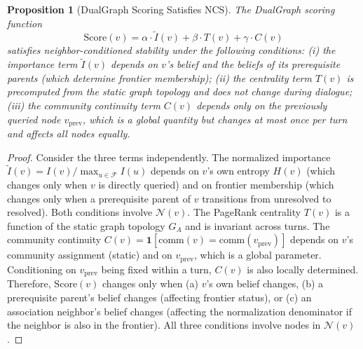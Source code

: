 \documentclass[11pt,a4paper]{article}
\newtheorem{proposition}{Proposition}
\begin{document}
\begin{proposition}[DualGraph Scoring Satisfies NCS]
\label{prop:ncs_holds}
The DualGraph scoring function
\[
  \mathrm{Score}(v) = \alpha \cdot \tilde{I}(v)
    + \beta \cdot T(v) + \gamma \cdot C(v)
\]
satisfies neighbor-conditioned stability under the following conditions:
(i) the importance term $\tilde{I}(v)$ depends on $v$'s belief and the
beliefs of its prerequisite parents (which determine frontier membership);
(ii) the centrality term $T(v)$ is precomputed from the static graph
topology and does not change during dialogue; (iii) the community continuity
term $C(v)$ depends only on the previously queried node $v_{\mathrm{prev}}$,
which is a global quantity but changes at most once per turn and affects all
nodes equally.
\end{proposition}

\begin{proof}
Consider the three terms independently. The normalized importance
$\tilde{I}(v) = I(v) / \max_{u \in \mathcal{F}} I(u)$ depends on $v$'s own
entropy $H(v)$ (which changes only when $v$ is directly queried) and on
frontier membership (which changes only when a prerequisite parent of $v$
transitions from unresolved to resolved). Both conditions involve
$\mathcal{N}(v)$. The PageRank centrality $T(v)$ is a function of the static
graph topology $G_A$ and is invariant across turns. The community continuity
$C(v) = \mathbf{1}[\mathrm{comm}(v) = \mathrm{comm}(v_{\mathrm{prev}})]$
depends on $v$'s community assignment (static) and on $v_{\mathrm{prev}}$,
which is a global parameter. Conditioning on $v_{\mathrm{prev}}$ being fixed
within a turn, $C(v)$ is also locally determined. Therefore,
$\mathrm{Score}(v)$ changes only when (a) $v$'s own belief changes,
(b) a prerequisite parent's belief changes (affecting frontier status), or
(c) an association neighbor's belief changes (affecting the normalization
denominator if the neighbor is also in the frontier). All three conditions
involve nodes in $\mathcal{N}(v)$.
\end{proof}
\end{document}
